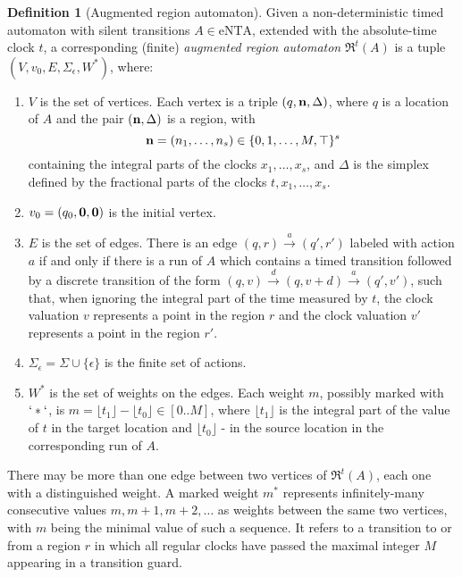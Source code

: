 \documentclass[11pt]{amsart}
\theoremstyle{definition}
\newtheorem{definition}[theorem]{Definition}
\newcommand{\ARRR}{\mathfrak{R}^t}
\newcommand{\ntaeps}{\mathrm{eNTA}}
\newcommand{\eActions}{\Sigma_{\epsilon}}
\begin{document}
\begin{definition}[Augmented region automaton]
	\label{def:aug_region_automaton}
	Given a non-deterministic timed automaton with silent transitions $A \in \ntaeps$, extended with the absolute-time clock $t$, a corresponding (finite) \emph{augmented region automaton} $\ARRR(A)$ is a tuple $(V, v_0, E, \eActions, W^*)$, where:
	\begin{enumerate}
		\item $V$ is the set of vertices.
		Each vertex is a triple $(q, {\bf n}, \Delta)$,	where $q$ is a location of $A$ and the pair $({\bf n}, \Delta)$ is a region, with
		\begin{equation}
			{\bf n} = (n_1, \ldots, n_s) \in \{0, 1, \ldots, M, \top \}^{s}
		\end{equation}
		containing the integral parts of the clocks $x_1, \ldots, x_s$, and $\Delta$
		is the simplex defined by the fractional parts of the clocks $t, x_1, \ldots, x_s$.
		\item $v_0 = (q_0, {\bf 0}, {\bf 0})$ is the initial vertex.
		\item $E$ is the set of edges.
		There is an edge $(q, r) \xrightarrow{a} (q',r')$ labeled with action $a$ if and only if there is a run of $A$  which contains a timed transition followed by a discrete transition of the form $(q, v) \xrightarrow{d} (q, v + d) \xrightarrow{a} (q', v')$, such that, when ignoring the integral part of the time measured by $t$, the clock valuation $v$ represents a point in the region $r$ and the clock valuation $v'$ represents a point in the region $r'$.
		
		\item $\eActions = \Sigma \cup \{\epsilon\}$ is the finite set of actions.
		\item $W^*$ is the set of weights on the edges.
		Each weight $m$, possibly marked with $`*`$, is $m = \lfloor t_1 \rfloor - \lfloor t_0 \rfloor \in [0..M]$, where $\lfloor t_1 \rfloor$ is the integral part of the value of $t$ in the target location and $\lfloor t_0 \rfloor$ - in the source location in the corresponding run of $A$.
	\end{enumerate}
\end{definition}
	There may be more than one edge between two vertices of $\ARRR(A)$, each one with a distinguished weight.
	A marked weight $m^*$ represents infinitely-many consecutive values $m, m+1, m+2, \ldots$ as weights between the same two vertices, with $m$ being the minimal value of such a sequence.
	It refers to a transition to or from a region $r$ in which all regular clocks have passed the maximal integer $M$ appearing in a transition guard.
\end{document}
